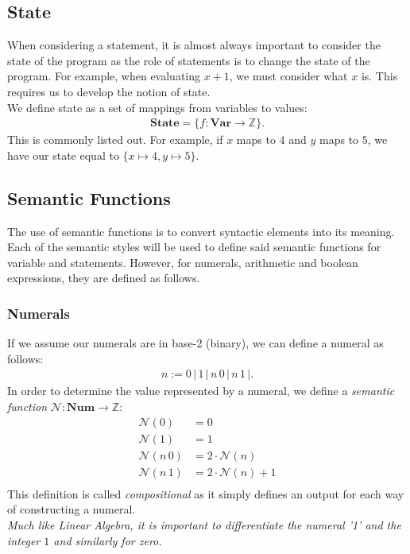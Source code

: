 \documentclass[a4paper, 12pt, twoside]{article}
\begin{document}
\subsection{State}

When considering a statement, it is almost always important to consider the
state of the program as the role of statements is to change the state
of the program. For example, when evaluating $x + 1$, we must consider
what $x$ is. This requires us to develop the notion of state.
\\[\baselineskip]
We define state as a set of mappings from variables to values: \begin{gather*}
  \textbf{State} = \{f : \textbf{Var} \to \mathbb{Z}\}.
\end{gather*} This is commonly listed out. For example, if $x$ maps to $4$ and 
$y$ maps to $5$, we have our state equal to $\{x \mapsto 4, y \mapsto 5\}$. 

\subsection{Semantic Functions}

The use of semantic functions is to convert syntactic elements into its meaning.
Each of the semantic styles will be used to define said semantic functions
for variable and statements. However, for numerals, arithmetic and boolean
expressions, they are defined as follows. 

\subsubsection{Numerals}

If we assume our numerals are in base-2 (binary), we can define a numeral
as follows: \begin{gather*}
  n := 0 \, | \, 1 \, | \, n \, 0 \, | \, n \, 1 \, |.
\end{gather*} In order to determine the value represented by a numeral, we
define a \textit{semantic function} $\mathcal{N} : \textbf{Num} \to \mathbb{Z}$:
\begin{align*}
  \mathcal{N}(0) &= 0 \\
  \mathcal{N}(1) &= 1 \\
  \mathcal{N}(n \, 0) &= 2 \cdot \mathcal{N}(n) \\
  \mathcal{N}(n \, 1) &= 2 \cdot \mathcal{N}(n) + 1 \\
\end{align*} This definition is called \textit{compositional} as it simply
defines an output for each way of constructing a numeral.
\\[\baselineskip]
\textit{Much like Linear Algebra, it is important to differentiate
the numeral '1' and the integer $1$ and similarly for zero.}
\end{document}

